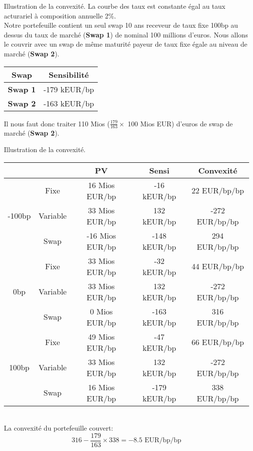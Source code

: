 \documentclass{beamer}
\begin{document}
\begin{frame}{Illustration de la convexité.}
La courbe des taux est constante égal au taux acturariel à composition annuelle 2\%.\\
\vspace{0.5cm}
Notre portefeuille contient un seul swap 10 ans receveur de taux fixe 100bp au dessus du taux de marché (\textbf{Swap 1}) de nominal 100 millions d'euros. Nous allons le couvrir avec un swap de même maturité payeur de taux fixe égale au niveau de marché (\textbf{Swap 2}).\\
\begin{center}
\begin{tabular}{|c|c|}
\hline
Swap&Sensibilité \\ 
\hline
\textbf{Swap 1} &-179 kEUR/bp \\ 
\textbf{Swap 2} &-163 kEUR/bp \\ 
\hline
\end{tabular}
\end{center}
Il nous faut donc traiter 110 Mios ($\frac{179}{163} \times$ 100 Mios EUR)  d'euros de swap de marché (\textbf{Swap 2}).
\end{frame}

\begin{frame}{Illustration de la convexité.}
\small
\begin{tabular}{|c|c|c|c|c|}
\hline
&&PV&Sensi&Convexité  \\ 
\hline
\multirow{3}{*}{-100bp}&Fixe& 16 Mios EUR/bp &  -16 kEUR/bp & 22 EUR/bp/bp \\ 
&Variable& 33 Mios EUR/bp & 132 kEUR/bp & -272 EUR/bp/bp \\ 
&Swap& -16 Mios EUR/bp & -148 kEUR/bp & 294 EUR/bp/bp \\ 
\hline
\multirow{3}{*}{0bp}&Fixe& 33 Mios EUR/bp &  -32 kEUR/bp & 44 EUR/bp/bp \\ 
&Variable& 33 Mios EUR/bp & 132 kEUR/bp & -272 EUR/bp/bp \\ 
&Swap& 0 Mios EUR/bp & -163 kEUR/bp & 316 EUR/bp/bp \\ 
\hline
\multirow{3}{*}{100bp}&Fixe& 49 Mios EUR/bp &  -47 kEUR/bp & 66 EUR/bp/bp \\ 
&Variable& 33 Mios EUR/bp & 132 kEUR/bp & -272 EUR/bp/bp \\ 
&Swap& 16 Mios EUR/bp & -179 kEUR/bp & 338 EUR/bp/bp \\ 
\hline
\end{tabular}\\
\normalsize
\vspace{0.5cm}
La convexité du portefeuille couvert:
\[
316 - \frac{179}{163} \times 338 = -8.5\text{ EUR/bp/bp}
\]
\end{frame}
\end{document}
